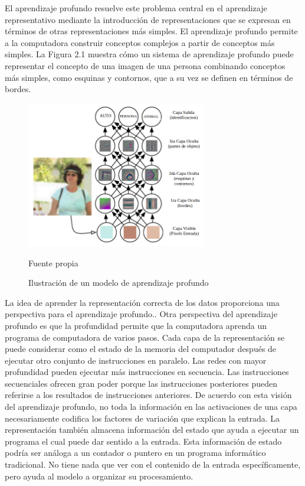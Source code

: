 	\vskip 0.4cm 
	El aprendizaje profundo resuelve este problema central en el aprendizaje representativo mediante la introducción de representaciones que se expresan en términos de otras representaciones más simples. El aprendizaje profundo permite a la computadora construir conceptos complejos a partir de conceptos más simples. La Figura 2.1 muestra cómo un sistema de aprendizaje profundo puede representar el concepto de una imagen de una persona combinando conceptos más simples, como esquinas y contornos, que a su vez se definen en términos de bordes.
		\begin{figure}[H]
		\begin{center}
		\includegraphics[width=0.7\textwidth]{images/marcoteorico/deepExam}
		\end{center}
		\begin{center}
		\caption{\small{Ilustración de un modelo de aprendizaje profundo}}
		\vskip -0.25cm
		{\small{Fuente propia}}
		\end{center}
		\vspace{-1.5em}
		\end{figure}
	\vskip 0.4cm 
	La idea de aprender la representación correcta de los datos proporciona una perspectiva para el aprendizaje profundo.\citep{Goodfellow-et-al-2016}. Otra perspectiva del aprendizaje profundo es que la profundidad permite que la computadora aprenda un programa de computadora de varios pasos. Cada capa de la representación se puede considerar como el estado de la memoria del computador después de ejecutar otro conjunto de instrucciones en paralelo. Las redes con mayor profundidad pueden ejecutar más instrucciones en secuencia. Las instrucciones secuenciales ofrecen gran poder porque las instrucciones posteriores pueden referirse a los resultados de instrucciones anteriores. De acuerdo con esta visión del aprendizaje profundo, no toda la información en las activaciones de una capa necesariamente codifica los factores de variación que explican la entrada. La representación también almacena información del estado que ayuda a ejecutar un programa el cual puede dar sentido a la entrada. Esta información de estado podría ser análoga a un contador o puntero en un programa informático tradicional. No tiene nada que ver con el contenido de la entrada específicamente, pero ayuda al modelo a organizar su procesamiento.
